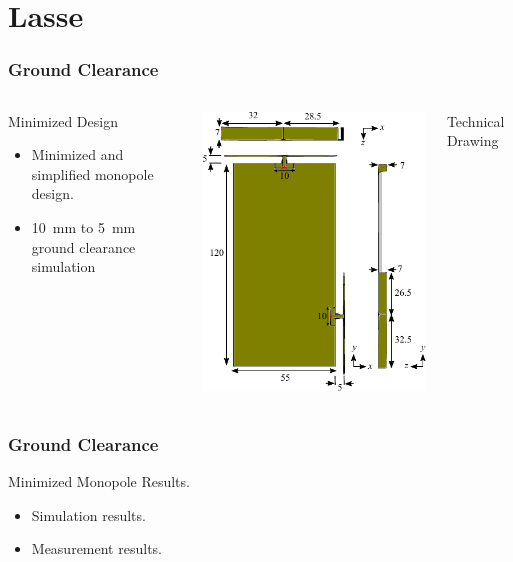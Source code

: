 \section{Lasse}
\begin{frame}[fragile]
  \frametitle{Ground Clearance}
  \begin{columns}[onlytextwidth,t]
    \begin{block}{Minimized Design}
      \begin{itemize}
      \item Minimized and simplified monopole design.
      \item \SI{10}{mm} to \SI{5}{mm} ground clearance simulation
      \end{itemize}
    \end{block}
    \begin{center}
      \includegraphics[scale=0.7]{img/Lasse/3d_drawing.pdf}
    \end{center}
    Technical Drawing
  \end{columns}
\end{frame}

\begin{frame}
  \frametitle{Ground Clearance}
    \begin{block}{Minimized Monopole Results.}
      \begin{itemize}
      \item Simulation results.
      \item Measurement results.
      \end{itemize}
    \end{block}
\end{frame}

